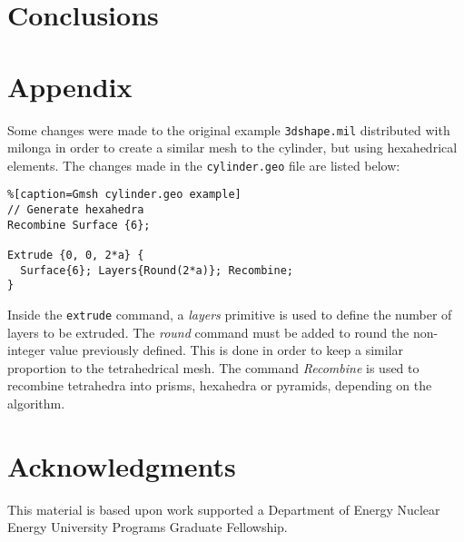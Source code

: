 \documentclass{anstrans}
\begin{document}
\section{Conclusions}

\appendix
\section{Appendix}
\label{Appendix}
Some changes were made to the original example \texttt{3dshape.mil} distributed
with milonga in order to create a similar mesh to the cylinder, but using
hexahedrical elements. The changes made in the \texttt{cylinder.geo} file
are listed below:

\begin{lstlisting}%[caption=Gmsh cylinder.geo example]
// Generate hexahedra
Recombine Surface {6};

Extrude {0, 0, 2*a} {
  Surface{6}; Layers{Round(2*a)}; Recombine;
}
\end{lstlisting}

Inside the \texttt{extrude} command, a \textit{layers} primitive is used to
define the number of layers to be extruded. The \textit{round} command must
be added to round the non-integer value previously defined. This is done
in order to keep a similar proportion to the tetrahedrical mesh. The
command \textit{Recombine} is used to recombine tetrahedra into prisms,
hexahedra or pyramids, depending on the algorithm.

\section{Acknowledgments}
This material is based upon work supported a Department of Energy Nuclear
Energy University Programs Graduate Fellowship.


\end{document}
